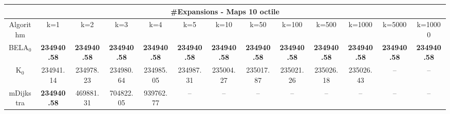 \begin{tabular}{c|cccccccccccc}\toprule
\multicolumn{13}{c}{#Expansions - Maps 10 octile}\\ \midrule
Algorithm & k=1 & k=2 & k=3 & k=4 & k=5 & k=10 & k=50 & k=100 & k=500 & k=1000 & k=5000 & k=10000 \\ \midrule
BELA$_0$ & \textbf{234940.58} & \textbf{234940.58} & \textbf{234940.58} & \textbf{234940.58} & \textbf{234940.58} & \textbf{234940.58} & \textbf{234940.58} & \textbf{234940.58} & \textbf{234940.58} & \textbf{234940.58} & \textbf{234940.58} & \textbf{234940.58} \\
K$_0$ & 234941.14 & 234978.23 & 234980.64 & 234985.05 & 234987.31 & 235004.27 & 235017.87 & 235021.26 & 235026.18 & 235026.43 & -- & -- \\
mDijkstra & \textbf{234940.58} & 469881.31 & 704822.05 & 939762.77 & -- & -- & -- & -- & -- & -- & -- & -- \\ \bottomrule 
\end{tabular}
